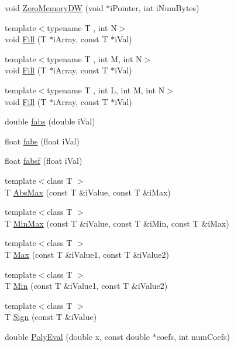 \begin{DoxyCompactItemize}
\item 
void \mbox{\hyperlink{a00852_a0e598e79488a12354e9dbc340fa99b5a}{Zero\+Memory\+DW}} (void $\ast$i\+Pointer, int i\+Num\+Bytes)
\item 
{\footnotesize template$<$typename T , int N$>$ }\\void \mbox{\hyperlink{a00852_a1e72222769ecdf34fa73ae38c0c709df}{Fill}} (T $\ast$i\+Array, const T $\ast$i\+Val)
\item 
{\footnotesize template$<$typename T , int M, int N$>$ }\\void \mbox{\hyperlink{a00852_a480beff32ac0847c665f735fd8f78c0a}{Fill}} (T $\ast$i\+Array, const T $\ast$i\+Val)
\item 
{\footnotesize template$<$typename T , int L, int M, int N$>$ }\\void \mbox{\hyperlink{a00852_a114e6f06cf5789da4aad7ae0d786876e}{Fill}} (T $\ast$i\+Array, const T $\ast$i\+Val)
\item 
double \mbox{\hyperlink{a00852_aa4fa4d0765a764b020102cdbff8b45b0}{fabs}} (double i\+Val)
\item 
float \mbox{\hyperlink{a00852_af486dfb226661e4a47d7b42eca881759}{fabs}} (float i\+Val)
\item 
float \mbox{\hyperlink{a00852_a7fc4d4cd59850b8b875d085467ff5850}{fabsf}} (float i\+Val)
\item 
{\footnotesize template$<$class T $>$ }\\T \mbox{\hyperlink{a00852_aa4cbb7d8707ad89fc5ba5169ebb75201}{Abs\+Max}} (const T \&i\+Value, const T \&i\+Max)
\item 
{\footnotesize template$<$class T $>$ }\\T \mbox{\hyperlink{a00852_aca59c4cdf56130ee251118c02a9963e3}{Min\+Max}} (const T \&i\+Value, const T \&i\+Min, const T \&i\+Max)
\item 
{\footnotesize template$<$class T $>$ }\\T \mbox{\hyperlink{a00852_a55ac62cf1b543338c58f8dd0d747c56c}{Max}} (const T \&i\+Value1, const T \&i\+Value2)
\item 
{\footnotesize template$<$class T $>$ }\\T \mbox{\hyperlink{a00852_a38c17ad30c1eb394bfa06e662d8d2598}{Min}} (const T \&i\+Value1, const T \&i\+Value2)
\item 
{\footnotesize template$<$class T $>$ }\\T \mbox{\hyperlink{a00852_ab6a3e1aef81cd84dec2eee9a27755bb0}{Sign}} (const T \&i\+Value)
\item 
double \mbox{\hyperlink{a00852_aa0094a6a87ca0c48f58b48ce5eea636e}{Poly\+Eval}} (double x, const double $\ast$coefs, int num\+Coefs)

\end{DoxyCompactItemize}
